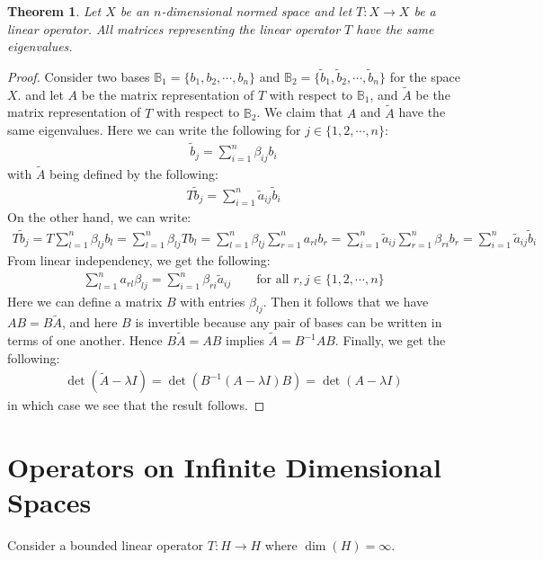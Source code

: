 \documentclass[11pt]{book}
\theoremstyle{break}
\theoremstyle{break}
\newtheorem{thm}{Theorem}[section]
\newcommand{\that}[1]{\widetilde{#1}}
\begin{document}
\begin{thm}
Let $X$ be an $n$-dimensional normed space and let $T:X \to X$ be a linear operator. All matrices representing the linear operator $T$ have the same eigenvalues. 
\end{thm}
\begin{proof}
Consider two bases $\mathbb{B}_1= \{b_1,b_2,\cdots, b_n\}$ and $\mathbb{B}_2 = \{\that{b}_1,\that{b}_2,\cdots, \that{b}_n\}$ for the space $X$. and let $A$ be the matrix representation of $T$ with respect to $\mathbb{B}_1$, and $\that{A}$ be the matrix representation of $T$ with respect to $\mathbb{B}_2$. We claim that $A$ and $\that{A}$ have the same eigenvalues. Here we can write the following for $j\in \{1,2,\cdots, n\}$:
\begin{align*}
\that{b}_j = \sum_{i=1}^n \beta_{ij}b_i
\end{align*}
with $\that{A}$ being defined by the following:
\begin{align*}
T\that{b}_j = \sum_{i=1}^n \that{a}_{ij}\that{b}_i
\end{align*}
On the other hand, we can write:
\begin{align*}
T\that{b}_j = T\sum_{l=1}^n \beta_{lj}b_l = \sum_{l=1}^n \beta_{lj}Tb_l =\sum_{l=1}^n \beta_{lj}\sum_{r=1}^n a_{rl}b_r= \sum_{i=1}^n \that{a}_{ij}\sum_{r=1}^n \beta_{ri}b_r = \sum_{i=1}^n \that{a}_{ij}\that{b}_i
\end{align*}
From linear independency, we get the following:
\begin{align*}
\sum_{l=1}^n a_{rl}\beta_{lj} = \sum_{i=1}^n \beta_{ri}\that{a}_{ij} \qquad \text{for all }r,j \in \{1,2,\cdots, n\}
\end{align*}
Here we can define a matrix $B$ with entries $\beta_{lj}$. Then it follows that we have $AB = B \that{A}$, and here $B$ is invertible because any pair of bases can be written in terms of one another. Hence $B\that{A} = AB$ implies $\that{A} = B^{-1}A B$. Finally, we get the following:\begin{align*}
\det(\that{A} - \lambda I) = \det(B^{-1}(A-\lambda I)B ) =\det(A -\lambda I)
\end{align*}
in which case we see that the result follows. 
\end{proof}







\newpage
\section[Operators on Infinite Dimensional Spaces]{\color{red}Operators on Infinite Dimensional Spaces\color{black}}
Consider a bounded linear operator $T:H \to H$ where $\dim(H) = \infty$.
\end{document}
